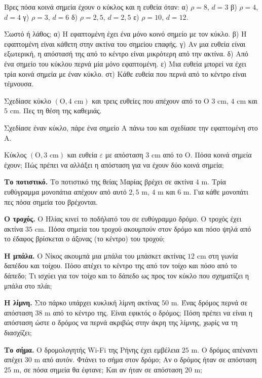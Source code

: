 \ex Βρες πόσα κοινά σημεία έχουν ο κύκλος και η ευθεία όταν: α) $\rho=8$, $d=3$ β) $\rho=4$, $d=4$ γ) $\rho=3$, $d=6$ δ) $\rho=2{,}5$, $d=2{,}5$ ε) $\rho=10$, $d=12$.

\ex Σωστό ή λάθος; α) Η εφαπτομένη έχει ένα μόνο κοινό σημείο με τον κύκλο. β) Η εφαπτομένη είναι κάθετη στην ακτίνα του σημείου επαφής. γ) Αν μια ευθεία είναι εξωτερική, η απόστασή της από το κέντρο είναι μικρότερη από την ακτίνα. δ) Από ένα σημείο του κύκλου περνά μία μόνο εφαπτομένη. ε) Μια ευθεία μπορεί να έχει τρία κοινά σημεία με έναν κύκλο. στ) Κάθε ευθεία που περνά από το κέντρο είναι τέμνουσα.

\ex Σχεδίασε κύκλο $(\mathrm{Ο},4\text{ cm})$ και τρεις ευθείες που απέχουν από το $\mathrm{Ο}$ $3$ cm, $4$ cm και $5$ cm. Πες τη θέση της καθεμιάς.

\ex Σχεδίασε έναν κύκλο, πάρε ένα σημείο $\mathrm{Α}$ πάνω του και σχεδίασε την εφαπτομένη στο $\mathrm{Α}$.

\ex Κύκλος $(\mathrm{Ο},3\text{ cm})$ και ευθεία $\varepsilon$ με απόσταση $3$ cm από το $\mathrm{Ο}$. Πόσα κοινά σημεία έχουν; Πώς πρέπει να αλλάξει η απόσταση για να έχουν δύο κοινά σημεία;


\ex \textbf{Το ποτιστικό.} Το ποτιστικό της θείας Μαρίας βρέχει σε ακτίνα $4$ m. Τρία ευθύγραμμα μονοπάτια απέχουν από αυτό $2{,}5$ m, $4$ m και $6$ m. Για κάθε μονοπάτι πες πόσα σημεία του βρέχονται.

\ex \textbf{Ο τροχός.} Ο Ηλίας κινεί το ποδήλατό του σε ευθύγραμμο δρόμο. Ο τροχός έχει ακτίνα $35$ cm. Πόσα σημεία του τροχού ακουμπούν στον δρόμο και πόσο ψηλά από το έδαφος βρίσκεται ο άξονας (το κέντρο) του τροχού;

\ex \textbf{Η μπάλα.} Ο Νίκος ακουμπά μια μπάλα του μπάσκετ ακτίνας $12$ cm στη γωνία δαπέδου και τοίχου. Πόσο απέχει το κέντρο της από τον τοίχο και πόσο από το δάπεδο; Τι ισχύει για τον τοίχο και το δάπεδο ως προς τον κύκλο που σχηματίζει η μπάλα στο πλάι;

\ex \textbf{Η λίμνη.} Στο πάρκο υπάρχει κυκλική λίμνη ακτίνας $50$ m. Ένας δρόμος περνά σε απόσταση $38$ m από το κέντρο της. Είναι εφικτός ο δρόμος; Πόση πρέπει να είναι η απόσταση ώστε ο δρόμος να περνά ακριβώς στην άκρη της λίμνης, χωρίς να τη διασχίζει;

\ex \textbf{Το σήμα.} Ο δρομολογητής Wi-Fi της Ρήνης έχει εμβέλεια $25$ m. Ο δρόμος απέναντι απέχει $30$ m από αυτόν. Φτάνει το σήμα στον δρόμο; Αν ο δρόμος ήταν σε απόσταση $25$ m, σε πόσα σημεία θα έφτανε; Και αν ήταν σε απόσταση $20$ m;

